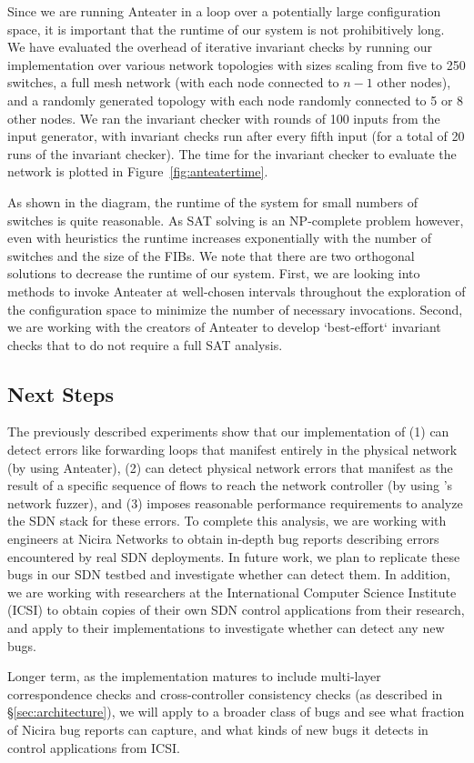     Since we are running Anteater in a loop over a potentially large
    configuration space, it is important that the runtime of our system is not
    prohibitively long. We have evaluated the overhead of iterative invariant checks by running our 
    implementation over various network topologies with sizes scaling from
    five to 250 switches, a full mesh network (with each node connected to $n - 1$ other nodes),
    and a randomly generated topology with each node randomly connected to 5
    or 8 other nodes.
    We ran the invariant checker with rounds of 100 inputs from the input generator, with invariant checks run after every fifth input (for a total of 20 runs of the invariant checker).
    The time for the invariant checker to evaluate the network is plotted in Figure~\ref{fig:anteatertime}.
   
    As shown in the diagram, the runtime of the system for small numbers of
    switches is quite reasonable. As SAT solving is an NP-complete problem
    however, even with heuristics the runtime increases exponentially with the
    number of switches and the size of the FIBs. We note that there are two
    orthogonal solutions to decrease the runtime of our system. First, we are
    looking into methods to invoke Anteater at well-chosen intervals
    throughout the exploration of the configuration space to minimize the
    number of necessary invocations. Second, we are working with the creators
    of Anteater to develop `best-effort` invariant checks that to do not
    require a full SAT analysis.

\subsection{Next Steps}
    The previously described experiments show that our implementation of \projectname{} (1) can detect errors like forwarding loops that manifest entirely in the physical network (by using Anteater), (2) can detect physical network errors that manifest as the result of a specific sequence of flows to reach the network controller (by using \projectname{}'s network fuzzer), and (3) imposes reasonable performance requirements to analyze the SDN stack for these errors.
    To complete this analysis, we are working with engineers at Nicira Networks to obtain in-depth bug reports describing errors encountered by real SDN deployments.
    In future work, we plan to replicate these bugs in our SDN testbed and investigate whether \projectname{} can detect them.
    In addition, we are working with researchers at the International Computer Science Institute (ICSI) to obtain copies of their own SDN control applications from their research, and apply \projectname{} to their implementations to investigate whether \projectname{} can detect any new bugs.

    Longer term, as the \projectname{} implementation matures to include multi-layer correspondence checks and cross-controller consistency checks (as described in \S\ref{sec:architecture}), we will apply \projectname{} to a broader class of bugs and see what fraction of Nicira bug reports \projectname{} can capture, and what kinds of new bugs it detects in control applications from ICSI. 
